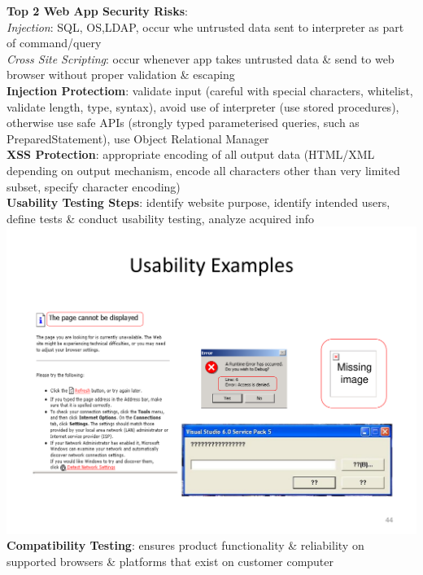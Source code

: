 \documentclass[a4paper]{article}
\begin{document}
\begin{multicols}{3}
        \textbf{Top 2 Web App Security Risks}:\\
        \textit{Injection}: SQL, OS,LDAP, occur whe untrusted data sent to interpreter as part of command/query\\
        \textit{Cross Site Scripting}: occur whenever app takes untrusted data \& send to web browser without proper validation \& escaping\\
        \textbf{Injection Protectiom}: validate input (careful with special characters, whitelist, validate length, type, syntax), avoid use of interpreter (use stored procedures), otherwise use safe APIs (strongly typed parameterised queries, such as PreparedStatement), use Object Relational Manager\\
        \textbf{XSS Protection}: appropriate encoding of all output data (HTML/XML depending on output mechanism, encode all characters other than very limited subset, specify character encoding)\\
        \textbf{Usability Testing Steps}: identify website purpose, identify intended users, define tests \& conduct usability testing, analyze acquired info\\
        \includegraphics[width=\linewidth]{340.pdf}\\
        \textbf{Compatibility Testing}: ensures product functionality \& reliability on supported browsers \& platforms that exist on customer computer\\
    \end{multicols}
    
\end{document}
